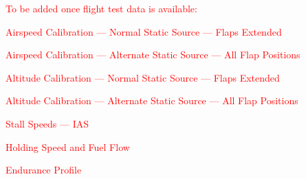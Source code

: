 

\clearpage

\textcolor{red}{To be added once flight test data is available:
\begin{enumerate*}
\item Airspeed Calibration --- Normal Static Source --- Flaps Extended
\item Airspeed Calibration --- Alternate Static Source --- All Flap Positions
\item Altitude Calibration --- Normal Static Source --- Flaps Extended
\item Altitude Calibration --- Alternate Static Source --- All Flap Positions
\item Stall Speeds --- IAS
\item Holding Speed and Fuel Flow
\item Endurance Profile
\end{enumerate*}}
\cleardoublepage
